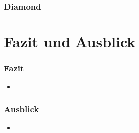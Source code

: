 \documentclass[11pt, ngerman]{beamer}
\begin{document}
\begin{frame}
\frametitle{Diamond}
\end{frame}
\section{Fazit und Ausblick}
\begin{frame}
\frametitle{Fazit}
\begin{itemize}
\item
\end{itemize}
\end{frame}

\begin{frame}
\frametitle{Ausblick}
\begin{itemize}
\item
\end{itemize}
\end{frame}
\end{document}
